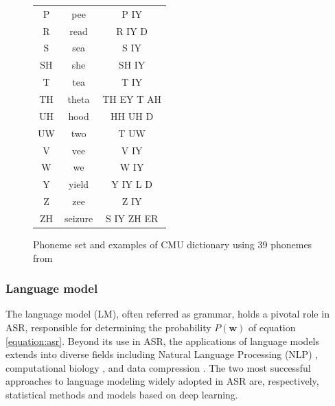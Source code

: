 \begin{figure}
\begin{minipage}[t]{0.5\textwidth}
\begin{tabular}{ccc}
            P & pee & P IY \\
            R & read & R IY D \\
            S & sea & S IY \\
            SH & she & SH IY \\
            T & tea & T IY \\
            TH & theta & TH EY T AH \\
            UH & hood & HH UH D \\
            UW & two & T UW \\
            V & vee & V IY \\
            W & we & W IY \\
            Y & yield & Y IY L D \\
            Z & zee & Z IY \\
            ZH & seizure & S IY ZH ER \\
            \hline
        \end{tabular}
    \end{minipage}
    \caption{Phoneme set and examples of CMU dictionary using 39 phonemes from \cite{weide1998carnegie}}
    \label{CMU_DICT}
\end{figure}


\subsubsection{Language model}%
The language model (LM), often referred as grammar, holds a pivotal role in ASR, responsible for determining the probability $P(\boldsymbol{w})$ of equation \ref{equation:asr}. Beyond its use in ASR, the applications of language models extends into diverse fields including Natural Language Processing (NLP) \cite{n-grams-NLP}, computational biology  \cite{n-grams-computational_biology}, and data compression \cite{n-gram-compression}. The two most successful approaches to language modeling widely adopted in ASR are, respectively, statistical methods and models based on deep learning. 


